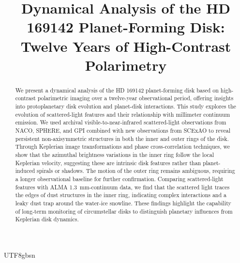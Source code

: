 \documentclass[twocolumn,twocolappendix]{aastex631}
\begin{document}
\begin{CJK*}{UTF8}{gbsn}

\title{Dynamical Analysis of the HD 169142 Planet-Forming Disk: Twelve Years of High-Contrast Polarimetry}



\begin{abstract}
We present a dynamical analysis of the HD 169142 planet-forming disk based on high-contrast polarimetric imaging over a twelve-year observational period, offering insights into protoplanetary disk evolution and planet-disk interactions. This study explores the evolution of scattered-light features and their relationship with millimeter continuum emission. We used archival visible-to-near-infrared scattered-light observations from NACO, SPHERE, and GPI combined with new observations from SCExAO to reveal persistent non-axisymmetric structures in both the inner and outer rings of the disk. Through Keplerian image transformations and phase cross-correlation techniques, we show that the azimuthal brightness variations in the inner ring follow the local Keplerian velocity, suggesting these are intrinsic disk features rather than planet-induced spirals or shadows. The motion of the outer ring remains ambiguous, requiring a longer observational baseline for further confirmation. Comparing scattered-light features with ALMA \SI{1.3}{\milli\meter}-continuum data, we find that the scattered light traces the edges of dust structures in the inner ring, indicating complex interactions and a leaky dust trap around the water-ice snowline. These findings highlight the capability of long-term monitoring of circumstellar disks to distinguish planetary influences from Keplerian disk dynamics.
\end{abstract}














\end{CJK*}
\end{document}
